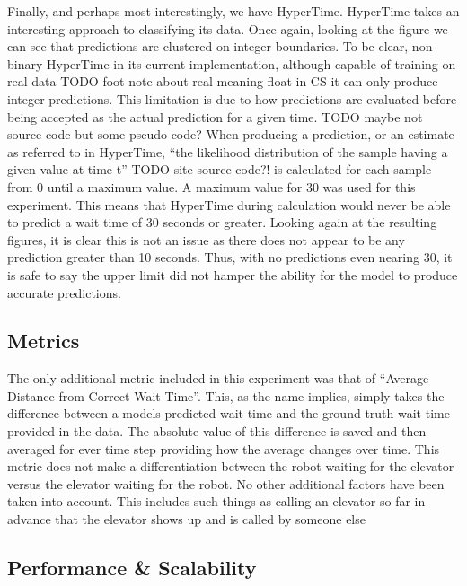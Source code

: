 Finally, and perhaps most interestingly, we have HyperTime. HyperTime takes an
interesting approach to classifying its data. Once again, looking at the figure
we can see that predictions are clustered on integer boundaries. To be clear,
non-binary HyperTime in its current implementation, although capable of training
on real data TODO foot note about real meaning float in CS it can only produce
integer predictions. This limitation is due to how predictions are evaluated
before being accepted as the actual prediction for a given time. TODO maybe
not source code but some pseudo code? When producing a prediction, or an
estimate as referred to in HyperTime, ``the likelihood distribution of the
sample having a given value at time t'' TODO site source code?! is calculated
for each sample from 0 until a maximum value. A maximum value for 30 was used
for this experiment. This means that HyperTime during calculation would never
be able to predict a wait time of 30 seconds or greater. Looking again at the
resulting figures, it is clear this is not an issue as there does not appear to
be any prediction greater than 10 seconds. Thus, with no predictions even
nearing 30, it is safe to say the upper limit did not hamper the ability for
the model to produce accurate predictions.

\subsection{ Metrics }

The only additional metric included in this experiment was that of ``Average
Distance from Correct Wait Time''. This, as the name implies, simply takes the
difference between a models predicted wait time and the ground truth wait time
provided in the data. The absolute value of this difference is saved and then
averaged for ever time step providing how the average changes over time. This
metric does not make a differentiation between the robot waiting for the
elevator versus the elevator waiting for the robot. No other additional
factors have been taken into account. This includes such things as calling an
elevator so far in advance that the elevator shows up and is called by someone
else

\subsection{ Performance \& Scalability }

